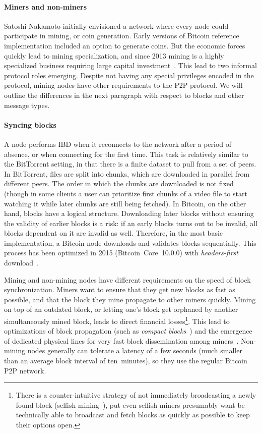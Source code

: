 \paragraph{Miners and non-miners}
Satoshi Nakamoto initially envisioned a network where every node could participate in mining, or coin generation.
Early versions of Bitcoin reference implementation included an option to generate coins.
But the economic forces quickly lead to mining specialization, and since 2013 mining is a highly specialized business requiring large capital investment~\cite{Kroll2013}.
This lead to two informal protocol roles emerging.
Despite not having any special privileges encoded in the protocol, mining nodes have other requirements to the P2P protocol.
We will outline the differences in the next paragraph with respect to blocks and other message types.
 
\paragraph{Syncing blocks}
A node performs IBD when it reconnects to the network after a period of absence, or when connecting for the first time.
This task is relatively similar to the BitTorrent setting, in that there is a finite dataset to pull from a set of peers.
In BitTorrent, files are split into chunks, which are downloaded in parallel from different peers.
The order in which the chunks are downloaded is not fixed (though in some clients a user can prioritize first chunks of a video file to start watching it while later chunks are still being fetched).
In Bitcoin, on the other hand, blocks have a logical structure.
Downloading later blocks without ensuring the validity of earlier blocks is a risk: if an early blocks turns out to be invalid, all blocks dependent on it are invalid as well.
Therefore, in the most basic implementation, a Bitcoin node downloads and validates blocks sequentially.
This process has been optimized in 2015 (Bitcoin~Core~10.0.0) with \textit{headers-first} download~\cite{Core2015}.

Mining and non-mining nodes have different requirements on the speed of block synchronization.
Miners want to ensure that they get new blocks as fast as possible, and that the block they mine propagate to other miners quickly.
Mining on top of an outdated block, or letting one's block get orphaned by another simultaneously mined block, leads to direct financial losses\footnote{There is a counter-intuitive strategy of not immediately broadcasting a newly found block (selfish mining~\cite{Eyal2018}), put even selfish miners presumably want be technically able to broadcast and fetch blocks as quickly as possible to keep their options open.}.
This lead to optimizations of block propagation (such as \textit{compact blocks}~\cite{Core2016}) and the emergence of dedicated physical lines for very fast block dissemination among miners~\cite{FALCON, FIBRE}.
Non-mining nodes generally can tolerate a latency of a few seconds (much smaller than an average block interval of ten~minutes), so they use the regular Bitcoin P2P network.
	

